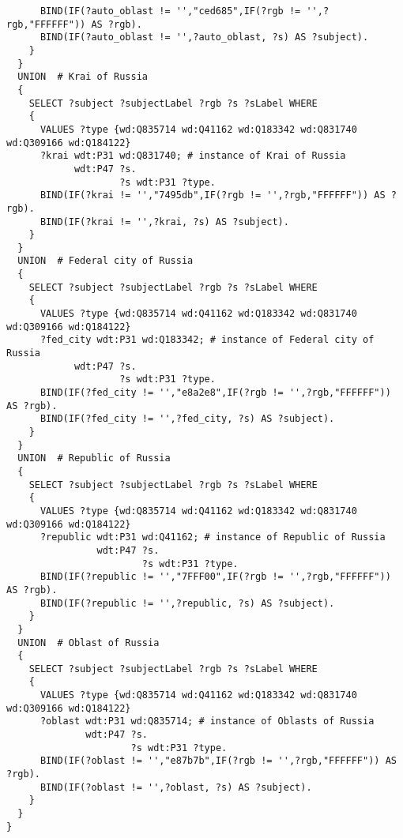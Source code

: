 \begin{lstlisting}
      BIND(IF(?auto_oblast != '',"ced685",IF(?rgb != '',?rgb,"FFFFFF")) AS ?rgb).
      BIND(IF(?auto_oblast != '',?auto_oblast, ?s) AS ?subject).
    }
  }
  UNION  # Krai of Russia
  {
    SELECT ?subject ?subjectLabel ?rgb ?s ?sLabel WHERE
    {
      VALUES ?type {wd:Q835714 wd:Q41162 wd:Q183342 wd:Q831740 wd:Q309166 wd:Q184122}
      ?krai wdt:P31 wd:Q831740; # instance of Krai of Russia
            wdt:P47 ?s.
                    ?s wdt:P31 ?type.
      BIND(IF(?krai != '',"7495db",IF(?rgb != '',?rgb,"FFFFFF")) AS ?rgb).
      BIND(IF(?krai != '',?krai, ?s) AS ?subject).
    }
  }
  UNION  # Federal city of Russia
  {
    SELECT ?subject ?subjectLabel ?rgb ?s ?sLabel WHERE
    {
      VALUES ?type {wd:Q835714 wd:Q41162 wd:Q183342 wd:Q831740 wd:Q309166 wd:Q184122}
      ?fed_city wdt:P31 wd:Q183342; # instance of Federal city of Russia
            wdt:P47 ?s.
                    ?s wdt:P31 ?type.
      BIND(IF(?fed_city != '',"e8a2e8",IF(?rgb != '',?rgb,"FFFFFF")) AS ?rgb).
      BIND(IF(?fed_city != '',?fed_city, ?s) AS ?subject).
    }
  }
  UNION  # Republic of Russia
  {
    SELECT ?subject ?subjectLabel ?rgb ?s ?sLabel WHERE
    {
      VALUES ?type {wd:Q835714 wd:Q41162 wd:Q183342 wd:Q831740 wd:Q309166 wd:Q184122}
      ?republic wdt:P31 wd:Q41162; # instance of Republic of Russia
                wdt:P47 ?s.
                        ?s wdt:P31 ?type.
      BIND(IF(?republic != '',"7FFF00",IF(?rgb != '',?rgb,"FFFFFF")) AS ?rgb).
      BIND(IF(?republic != '',?republic, ?s) AS ?subject).
    }
  }
  UNION  # Oblast of Russia
  {
    SELECT ?subject ?subjectLabel ?rgb ?s ?sLabel WHERE
    {
      VALUES ?type {wd:Q835714 wd:Q41162 wd:Q183342 wd:Q831740 wd:Q309166 wd:Q184122}
      ?oblast wdt:P31 wd:Q835714; # instance of Oblasts of Russia
              wdt:P47 ?s.
                      ?s wdt:P31 ?type.
      BIND(IF(?oblast != '',"e87b7b",IF(?rgb != '',?rgb,"FFFFFF")) AS ?rgb).
      BIND(IF(?oblast != '',?oblast, ?s) AS ?subject).
    }
  }
}
\end{lstlisting}%


